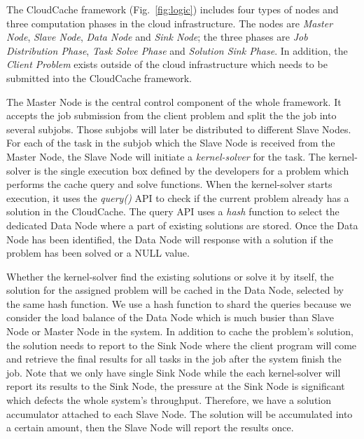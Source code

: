 The CloudCache framework (Fig.~\ref{fig:logic}) includes four types of nodes and three computation phases in the cloud infrastructure. The nodes are \emph{Master Node}, \emph{Slave Node}, \emph{Data Node} and \emph{Sink Node}; the three phases are \emph{Job Distribution Phase}, \emph{Task Solve Phase} and \emph{Solution Sink Phase}. In addition, the \emph{Client Problem} exists outside of the cloud infrastructure which needs to be submitted into the CloudCache framework.

The Master Node is the central control component of the whole framework. It accepts the job submission from the client problem and split the the job into several subjobs. Those subjobs will later be distributed to different Slave Nodes. For each of the task in the subjob which the Slave Node is received from the Master Node, the Slave Node will initiate a \emph{kernel-solver} for the task. The kernel-solver is the single execution box defined by the developers for a problem which performs the cache query and solve functions. When the kernel-solver starts execution, it uses the \emph{query()} API to check if the current problem already has a solution in the CloudCache. The query API uses a \emph{hash} function to select the dedicated Data Node where a part of existing solutions are stored. Once the Data Node has been identified, the Data Node will response with a solution if the problem has been solved or a NULL value.

Whether the kernel-solver find the existing solutions or solve it by itself, the solution for the assigned problem will be cached in the Data Node, selected by the same hash function. We use a hash function to shard the queries because we consider the load balance of the Data Node which is much busier than Slave Node or Master Node in the system. In addition to cache the problem's solution, the solution needs to report to the Sink Node where the client program will come and retrieve the final results for all tasks in the job after the system finish the job. Note that we only have single Sink Node while the each kernel-solver will report its results to the Sink Node, the pressure at the Sink Node is significant which defects the whole system's throughput. Therefore, we have a solution accumulator attached to each Slave Node. The solution will be accumulated into a certain amount, then the Slave Node will report the results once.

